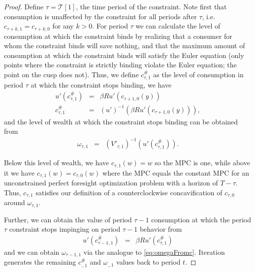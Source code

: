 \documentclass[titlepage]{\econtex}
\providecommand{\wAlt}{\omega}
\begin{document}
	
	\begin{proof}
	Define $\tau = \mathcal{T}[1]$, the time period of the constraint. Note first that consumption is unaffected by the constraint for all periods after $\tau$, i.e. $c_{\tau+k,1}=c_{\tau+k,0}$ for any $k > 0$. For period $\tau$ 	we can calculate the level of consumption at which the constraint binds by realizing that a consumer for whom the constraint binds will save nothing, and that the maximum amount of consumption at which the
	constraint binds will satisfy the Euler equation (only points where the constraint is strictly binding violate the Euler equation; the	point on the cusp does not). Thus, we define $c_{\tau,1}^{\#}$ as the level of consumption in period $\tau$ at which the constraint stops binding, we have
	\begin{eqnarray*}
		\label{eq:ctau1}
		u'(c_{\tau,1}^{\#})   & = & \beta R u'(c_{\tau+1,0}({y}))
		\\   c_{\tau,1}^{\#}       & = & (u')^{-1}\left(\beta R u'(c_{\tau+1,0}({y}))\right),
	\end{eqnarray*}
	and the level of wealth at which the constraint stops binding can be obtained from
	\begin{eqnarray}
	\label{eq:omegaFromc}
	\wAlt_{\tau,1} & = & \left(V'_{\tau,1}\right)^{-1}(u'(c_{\tau,1}^{\#}))  .
	\end{eqnarray}
	
	Below this level of wealth, we have $c_{\tau,1}(w) = w$ so the MPC is
	one, while above it we have $c_{\tau,1}(w) = c_{\tau,0}(w)$ where the MPC equals the constant MPC for an
	unconstrained perfect foresight optimization problem with a horizon of
	$T-\tau$. Thus, $c_{\tau,1}$ satisfies our definition of a
	counterclockwise concavification of $c_{\tau,0}$ around
	$\wAlt_{\tau,1}$.  
	
	Further, we can obtain the value of period $\tau-1$ consumption at which the period
	$\tau$ constraint stops impinging on period $\tau-1$ behavior from
	\begin{eqnarray*}
		u'(c_{\tau-1,1}^{\#})   & = & \beta R u'(c_{\tau,1}^{\#}) \label{eq:ctaum1}
	\end{eqnarray*}
	and we can obtain $\wAlt_{\tau-1,1}$ via the analogue to
	\eqref{eq:omegaFromc}.  Iteration generates the remaining
	$c_{.,1}^{\#}$ and $\wAlt_{.,1}$ values back to period $t$. 
	
	

\end{proof}
\end{document}
